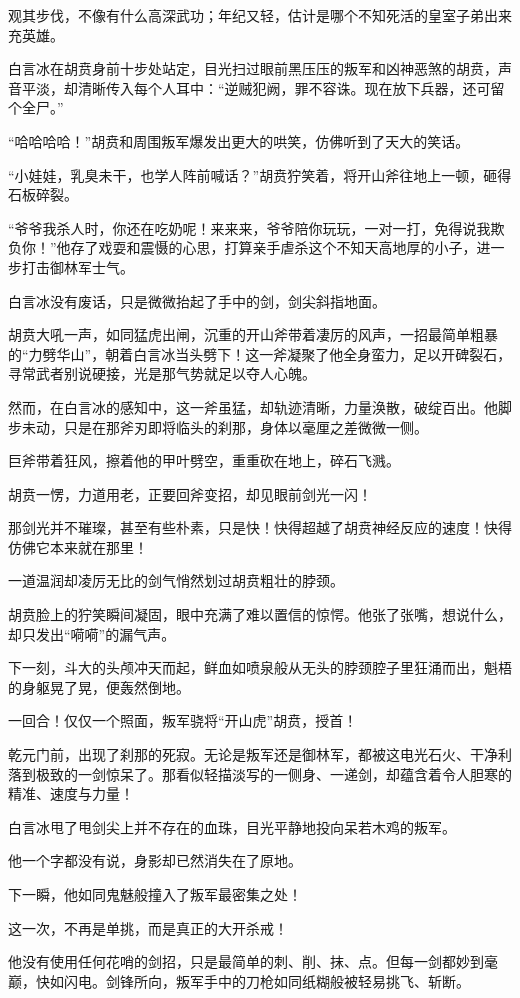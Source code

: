 观其步伐，不像有什么高深武功；年纪又轻，估计是哪个不知死活的皇室子弟出来充英雄。

白言冰在胡贲身前十步处站定，目光扫过眼前黑压压的叛军和凶神恶煞的胡贲，声音平淡，却清晰传入每个人耳中：“逆贼犯阙，罪不容诛。现在放下兵器，还可留个全尸。”

“哈哈哈哈！”胡贲和周围叛军爆发出更大的哄笑，仿佛听到了天大的笑话。

“小娃娃，乳臭未干，也学人阵前喊话？”胡贲狞笑着，将开山斧往地上一顿，砸得石板碎裂。

“爷爷我杀人时，你还在吃奶呢！来来来，爷爷陪你玩玩，一对一打，免得说我欺负你！”他存了戏耍和震慑的心思，打算亲手虐杀这个不知天高地厚的小子，进一步打击御林军士气。

白言冰没有废话，只是微微抬起了手中的剑，剑尖斜指地面。

胡贲大吼一声，如同猛虎出闸，沉重的开山斧带着凄厉的风声，一招最简单粗暴的“力劈华山”，朝着白言冰当头劈下！这一斧凝聚了他全身蛮力，足以开碑裂石，寻常武者别说硬接，光是那气势就足以夺人心魄。

然而，在白言冰的感知中，这一斧虽猛，却轨迹清晰，力量涣散，破绽百出。他脚步未动，只是在那斧刃即将临头的刹那，身体以毫厘之差微微一侧。

巨斧带着狂风，擦着他的甲叶劈空，重重砍在地上，碎石飞溅。

胡贲一愣，力道用老，正要回斧变招，却见眼前剑光一闪！

那剑光并不璀璨，甚至有些朴素，只是快！快得超越了胡贲神经反应的速度！快得仿佛它本来就在那里！

一道温润却凌厉无比的剑气悄然划过胡贲粗壮的脖颈。

胡贲脸上的狞笑瞬间凝固，眼中充满了难以置信的惊愕。他张了张嘴，想说什么，却只发出“嗬嗬”的漏气声。

下一刻，斗大的头颅冲天而起，鲜血如喷泉般从无头的脖颈腔子里狂涌而出，魁梧的身躯晃了晃，便轰然倒地。

一回合！仅仅一个照面，叛军骁将“开山虎”胡贲，授首！

乾元门前，出现了刹那的死寂。无论是叛军还是御林军，都被这电光石火、干净利落到极致的一剑惊呆了。那看似轻描淡写的一侧身、一递剑，却蕴含着令人胆寒的精准、速度与力量！

白言冰甩了甩剑尖上并不存在的血珠，目光平静地投向呆若木鸡的叛军。

他一个字都没有说，身影却已然消失在了原地。

下一瞬，他如同鬼魅般撞入了叛军最密集之处！

这一次，不再是单挑，而是真正的大开杀戒！

他没有使用任何花哨的剑招，只是最简单的刺、削、抹、点。但每一剑都妙到毫巅，快如闪电。剑锋所向，叛军手中的刀枪如同纸糊般被轻易挑飞、斩断。

